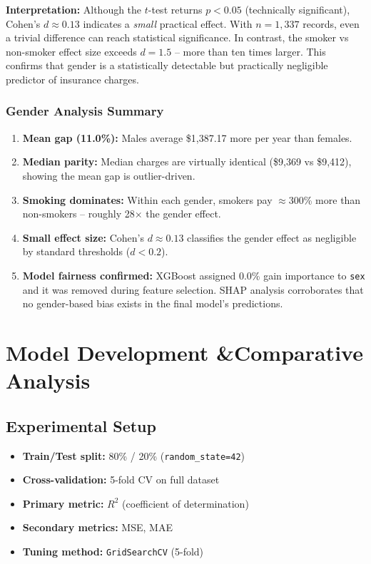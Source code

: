 \documentclass[12pt,a4paper]{report}
\begin{document}
\begin{infobox}
\textbf{Interpretation:} Although the $t$-test returns $p < 0.05$ (technically significant), Cohen's $d \approx 0.13$ indicates a \emph{small} practical effect. With $n = 1{,}337$ records, even a trivial difference can reach statistical significance. In contrast, the smoker vs non-smoker effect size exceeds $d = 1.5$ -- more than ten times larger. This confirms that gender is a statistically detectable but practically negligible predictor of insurance charges.
\end{infobox}

\subsection{Gender Analysis Summary}

\begin{enumerate}
  \item \textbf{Mean gap (11.0\%):} Males average \$1,387.17 more per year than females.
  \item \textbf{Median parity:} Median charges are virtually identical (\$9,369 vs \$9,412), showing the mean gap is outlier-driven.
  \item \textbf{Smoking dominates:} Within each gender, smokers pay $\approx$300\% more than non-smokers -- roughly 28$\times$ the gender effect.
  \item \textbf{Small effect size:} Cohen's $d \approx 0.13$ classifies the gender effect as negligible by standard thresholds ($d < 0.2$).
  \item \textbf{Model fairness confirmed:} XGBoost assigned 0.0\% gain importance to \texttt{sex} and it was removed during feature selection. SHAP analysis corroborates that no gender-based bias exists in the final model's predictions.
\end{enumerate}

\chapter{Model Development \&Comparative Analysis}

\section{Experimental Setup}

\begin{itemize}
  \item \textbf{Train/Test split:} 80\% / 20\% (\texttt{random\_state=42})
  \item \textbf{Cross-validation:} 5-fold CV on full dataset
  \item \textbf{Primary metric:} $R^2$ (coefficient of determination)
  \item \textbf{Secondary metrics:} MSE, MAE
  \item \textbf{Tuning method:} \texttt{GridSearchCV} (5-fold)
\end{itemize}
\end{document}
